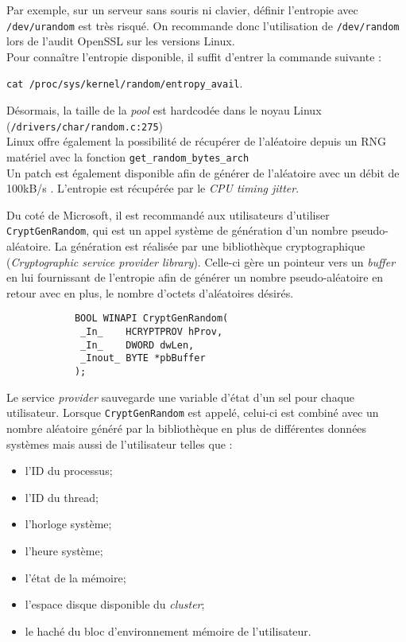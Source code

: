 			Par exemple, sur un serveur sans souris ni clavier, définir l'entropie avec	\texttt{/dev/urandom} est très risqué. On recommande donc l'utilisation de \texttt{/dev/random} lors de l'audit OpenSSL sur les versions Linux.\\
	
			Pour connaître l'entropie disponible, il suffit d'entrer la commande suivante :
			\begin{center}
				\texttt{cat /proc/sys/kernel/random/entropy\_avail}.\\
			\end{center}	
			
			Désormais, la taille de la \textit{pool} est hardcodée dans le noyau Linux (\texttt{/drivers/char/random.c:275})\\
			
			Linux offre également la possibilité de récupérer de l'aléatoire depuis un RNG matériel avec la fonction \texttt{get\_random\_bytes\_arch}\\
		
			Un patch est également disponible afin de générer de l'aléatoire avec un débit de 100kB/s \cite{mueller2013rng}. L'entropie est récupérée par le \textit{CPU timing jitter}.\\
			
		
			Du coté de Microsoft, il est recommandé aux utilisateurs d'utiliser \texttt{CryptGenRandom}, \cite{wikicryptgenrandom} qui est un appel système de génération d'un nombre pseudo-aléatoire. La génération est réalisée par une bibliothèque cryptographique (\textit{Cryptographic service provider library}). Celle-ci gère un pointeur vers un \textit{buffer} en lui fournissant de l'entropie afin de générer un nombre pseudo-aléatoire en retour avec en plus, le nombre d'octets d'aléatoires désirés.
			
			\begin{verbatim}
			BOOL WINAPI CryptGenRandom(
			 _In_    HCRYPTPROV hProv,
			 _In_    DWORD dwLen,
			 _Inout_ BYTE *pbBuffer
			);
			\end{verbatim}
			
			Le service \textit{provider} sauvegarde une variable d'état d'un sel pour chaque utilisateur. Lorsque \texttt{CryptGenRandom} est appelé, celui-ci est combiné avec un nombre aléatoire généré par la bibliothèque en plus de différentes données systèmes mais aussi de l'utilisateur telles que :\\
			\begin{itemize}
			\item l'ID du processus;
			\item l'ID du thread;
			\item l'horloge système;
			\item l'heure système;
			\item l'état de la mémoire;
			\item l'espace disque disponible du \textit{cluster};
			\item le haché du bloc d'environnement mémoire de l'utilisateur.\\
			\end{itemize} 
			
